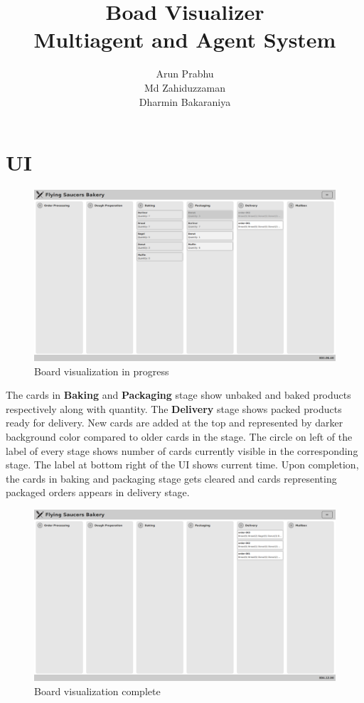 \documentclass[12pt]{article}
\title{Boad Visualizer\\Multiagent and Agent System}
\author{Arun Prabhu\\Md Zahiduzzaman\\Dharmin Bakaraniya}
\begin{document}
\maketitle{}
\pagebreak

\section{UI}
\begin{figure}[htpb]
	\centering
	\includegraphics[width=1.0\linewidth]{visualizer-ui.png}
	\caption{Board visualization in progress}
\end{figure}

The cards in \textbf{Baking} and \textbf{Packaging} stage show unbaked and baked products respectively along with quantity. The \textbf{Delivery} stage shows packed products ready for delivery. New cards are added at the top and represented by darker background color compared to older cards in the stage. The circle on left of the label of every stage shows number of cards currently visible in the corresponding stage. The label at bottom right of the UI shows current time. Upon completion, the cards in baking and packaging stage gets cleared and cards representing packaged orders appears in delivery stage.

\newpage
\begin{figure}[htpb]
	\centering
	\includegraphics[width=1.0\linewidth]{visualizer-complete.png}
	\caption{Board visualization complete}
\end{figure}
\end{document}
